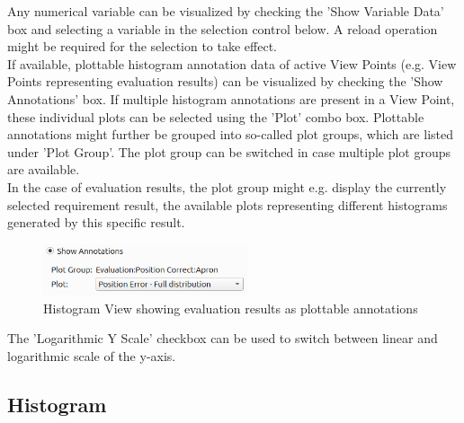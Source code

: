 Any numerical variable can be visualized by checking the 'Show Variable Data' box and selecting a variable in the selection control below.
A reload operation might be required for the selection to take effect. \\

If available, plottable histogram annotation data of active View Points (e.g. View Points representing evaluation results) can be visualized by checking the 'Show Annotations' box. 
If multiple histogram annotations are present in a View Point, these individual plots can be selected using the 'Plot' combo box.
Plottable annotations might further be grouped into so-called plot groups, which are listed under 'Plot Group'.
The plot group can be switched in case multiple plot groups are available. \\

In the case of evaluation results, the plot group might e.g. display the currently selected requirement result,
the available plots representing different histograms generated by this specific result. \\

\begin{figure}[H]
    \center
    \includegraphics[width=6cm,frame]{figures/histogram_annotation.png}
  \caption{Histogram View showing evaluation results as plottable annotations}
\end{figure}

The 'Logarithmic Y Scale' checkbox can be used to switch between linear and logarithmic scale of the y-axis. \\

\subsection{Histogram}



